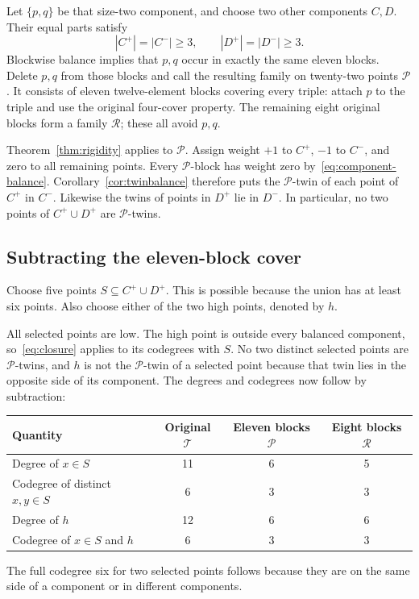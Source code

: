 \documentclass[11pt,letterpaper]{article}
\theoremstyle{definition}\newtheorem{definition}[theorem]{Definition}
\theoremstyle{remark}\newtheorem{remark}[theorem]{Remark}
\newcommand{\calT}{\mathcal T}
\newcommand{\calR}{\mathcal R}
\newcommand{\calP}{\mathcal P}
\begin{document}
Let $\{p,q\}$ be that size-two component, and choose two other components $C,D$. Their equal parts satisfy
\[
 |C^+|=|C^-|\ge3,\qquad |D^+|=|D^-|\ge3.
\]
Blockwise balance implies that $p,q$ occur in exactly the same eleven blocks. Delete $p,q$ from those blocks and call the resulting family on twenty-two points $\calP$. It consists of eleven twelve-element blocks covering every triple: attach $p$ to the triple and use the original four-cover property. The remaining eight original blocks form a family $\calR$; these all avoid $p,q$.

Theorem~\ref{thm:rigidity} applies to $\calP$. Assign weight $+1$ to $C^+$, $-1$ to $C^-$, and zero to all remaining points. Every $\calP$-block has weight zero by~\eqref{eq:component-balance}. Corollary~\ref{cor:twinbalance} therefore puts the $\calP$-twin of each point of $C^+$ in $C^-$. Likewise the twins of points in $D^+$ lie in $D^-$. In particular, no two points of $C^+\cup D^+$ are $\calP$-twins.

\subsection{Subtracting the eleven-block cover}
Choose five points $S\subseteq C^+\cup D^+$. This is possible because the union has at least six points. Also choose either of the two high points, denoted by $h$.

All selected points are low. The high point is outside every balanced component, so~\eqref{eq:closure} applies to its codegrees with $S$. No two distinct selected points are $\calP$-twins, and $h$ is not the $\calP$-twin of a selected point because that twin lies in the opposite side of its component. The degrees and codegrees now follow by subtraction:
\begin{center}
\begin{tabular}{@{}lccc@{}}
\toprule
Quantity & Original $\calT$ & Eleven blocks $\calP$ & Eight blocks $\calR$\\
\midrule
Degree of $x\in S$ & 11 & 6 & 5\\
Codegree of distinct $x,y\in S$ & 6 & 3 & 3\\
Degree of $h$ & 12 & 6 & 6\\
Codegree of $x\in S$ and $h$ & 6 & 3 & 3\\
\bottomrule
\end{tabular}
\end{center}
The full codegree six for two selected points follows because they are on the same side of a component or in different components.
\end{document}
